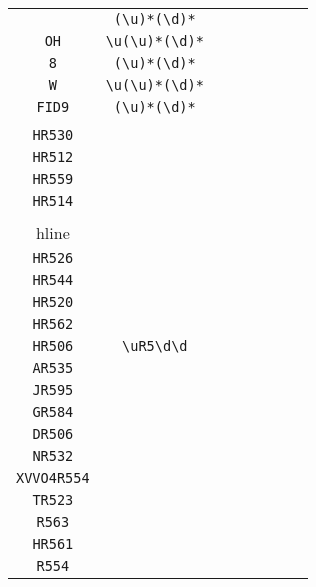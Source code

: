 \begin{longtable}{cccccccc}
\begin{tabular}{ll}
    \verb|UICXY440| & \verb|(\u)*(\d)*|\\
\verb|OH| & \verb|\u(\u)*(\d)*|\\
\verb|8| & \verb|(\u)*(\d)*|\\
\verb|W| & \verb|\u(\u)*(\d)*|\\
\verb|FID9| & \verb|(\u)*(\d)*|
\end{tabular}
\\\midrule 
\begin{tabular}{l}
    \verb|SR504|\\
\verb|HR530|\\
\verb|HR512|\\
\verb|HR559|\\
\verb|HR514|\\
\\hline\\
\verb|HR526|\\
\verb|HR544|\\
\verb|HR520|\\
\verb|HR562|\\
\verb|HR506|
\end{tabular}

&
\verb|\uR5\d\d|
&

\begin{tabular}{l}
    \verb|\uR5\d\d|\\
\verb|AR535|\\
\verb|JR595|\\
\verb|GR584|\\
\verb|DR506|\\
\verb|NR532|
\end{tabular}

&

\begin{tabular}{l}
    \verb.((\u)*(\d)*)|(H)R5\d\d.\\
\verb|XVVO4R554|\\
\verb|TR523|\\
\verb|R563|\\
\verb|HR561|\\
\verb|R554|
\end{tabular}

&


\end{longtable}
